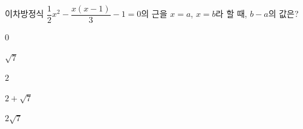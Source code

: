 이차방정식 $\dfrac{1}{2}x^2-\dfrac{x(x-1)}{3}-1=0$의 근을 $x=a$, $x=b$라 할 때, $b-a$의 값은? 
\begin{choices32}{\rule[-3ex]{0pt}{8ex}$0$}{\rule[-3ex]{0pt}{8ex}$\sqrt{7}$}{\rule[-3ex]{0pt}{8ex}$2$}{\rule[-3ex]{0pt}{8ex}$2+\sqrt{7}$}{\rule[-3ex]{0pt}{8ex}$2\sqrt{7}$}\end{choices32}
